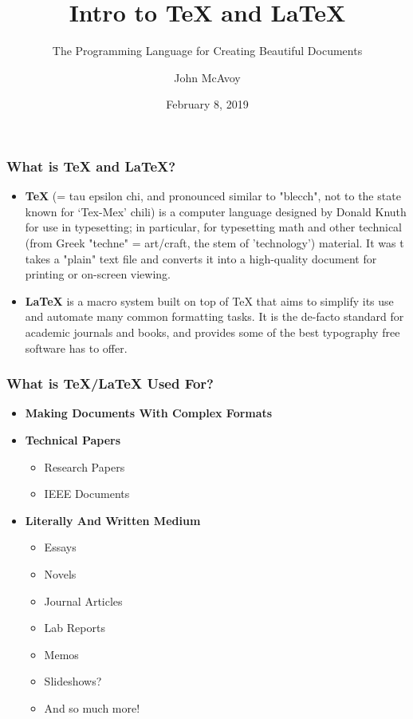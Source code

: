 \documentclass{beamer}
\title{Intro to {\TeX} and {\LaTeX}}
\subtitle{The Programming Language for Creating Beautiful Documents}
\author{John McAvoy}
\institute{A-Team Workshop}
\date{February 8, 2019}
\begin{document}
\frame{\titlepage}


\begin{frame}
  \frametitle{What is {\TeX} and {\LaTeX}?}

  \begin{itemize}
    \item \textbf{\TeX} (= tau epsilon chi, and pronounced similar to "blecch",
      not to the state known for `Tex-Mex' chili) is a computer language
      designed by Donald Knuth for use in typesetting; in particular, for
      typesetting math and other technical (from Greek "techne" = art/craft, the
      stem of 'technology') material. It was t takes a "plain" text file and
      converts it into a high-quality document for printing or on-screen
      viewing.\cite{tug} \cite{wikibooks}

    \item \textbf{\LaTeX} is a macro system built on top of TeX that aims
      to simplify its use and automate many common formatting tasks. It is the
      de-facto standard for academic journals and books, and provides some of
      the best typography free software has to offer. \cite{wikibooks}

  \end{itemize}
\end{frame}

\begin{frame}
  \frametitle{What is {\TeX}/{\LaTeX} Used For?}
  \begin{itemize}
    \item \textbf{Making Documents With Complex Formats}
    \item \textbf{Technical Papers}
      \begin{itemize}
        \item Research Papers
        \item IEEE Documents
      \end{itemize}

    \item \textbf{Literally And Written Medium}
      \begin{itemize}
        \item Essays
        \item Novels
        \item Journal Articles
        \item Lab Reports
        \item Memos
        \item Slideshows?
        \item And so much more!
      \end{itemize}
  \end{itemize}
\end{frame}
\end{document}
